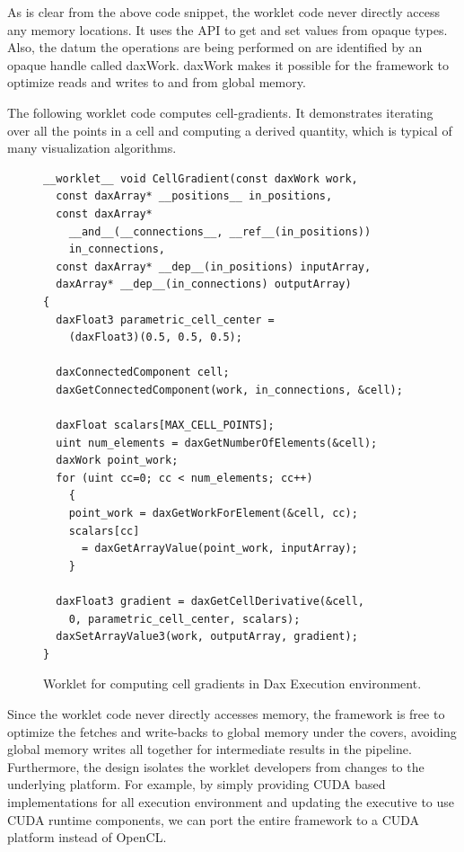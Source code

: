 \documentclass{vgtc}                          %
\begin{document}
As is clear from the above code snippet, the worklet code never directly access
any memory locations. It uses the API to get and set values from opaque types. Also,
the datum the operations are being performed on are identified by an opaque
handle called daxWork. daxWork makes it possible for the framework to optimize
reads and writes to and from global memory.

The following worklet code computes cell-gradients. It demonstrates
iterating over all the points in a cell and computing a derived quantity, which
is typical of many visualization algorithms.

\begin{figure}[htbp]
\centering
\begin{lstlisting}[language=Dax]
__worklet__ void CellGradient(const daxWork work,
  const daxArray* __positions__ in_positions,
  const daxArray*
    __and__(__connections__, __ref__(in_positions))
    in_connections,
  const daxArray* __dep__(in_positions) inputArray,
  daxArray* __dep__(in_connections) outputArray)
{
  daxFloat3 parametric_cell_center =
    (daxFloat3)(0.5, 0.5, 0.5);

  daxConnectedComponent cell;
  daxGetConnectedComponent(work, in_connections, &cell);

  daxFloat scalars[MAX_CELL_POINTS];
  uint num_elements = daxGetNumberOfElements(&cell);
  daxWork point_work;
  for (uint cc=0; cc < num_elements; cc++)
    {
    point_work = daxGetWorkForElement(&cell, cc);
    scalars[cc]
      = daxGetArrayValue(point_work, inputArray);
    }

  daxFloat3 gradient = daxGetCellDerivative(&cell,
    0, parametric_cell_center, scalars);
  daxSetArrayValue3(work, outputArray, gradient);
}
\end{lstlisting}
\caption{Worklet for computing cell gradients in Dax Execution environment.}
\label{fig:DaxCellGradientWorklet}
\end{figure}

Since the worklet code never directly accesses memory, the framework is free to
optimize the fetches and write-backs to global memory under the covers, avoiding
global memory writes all together for intermediate results in the pipeline.
Furthermore, the design isolates the worklet developers from changes to the
underlying platform. For example, by simply providing CUDA based implementations
for all execution environment and updating the executive to use CUDA runtime components, we
can port the entire framework to a CUDA platform instead of OpenCL.
\end{document}
